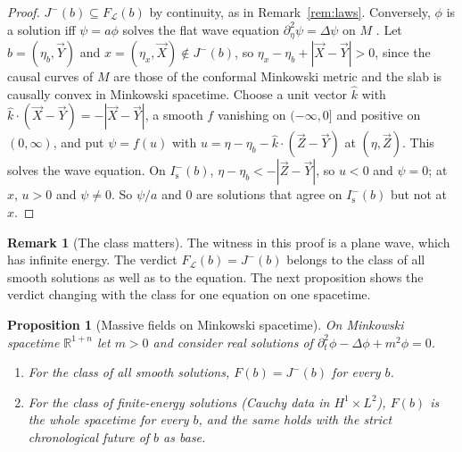 \documentclass[11pt]{article}
\newtheorem{proposition}[theorem]{Proposition}
\theoremstyle{definition}
\newtheorem{remark}[theorem]{Remark}
\newcommand{\Is}{I^-_{\mathrm s}}
\begin{document}
\begin{proof}
$J^-(b)\subseteq F_{\mathcal L}(b)$ by continuity, as in
Remark~\ref{rem:laws}. Conversely, $\phi$ is a solution iff $\psi=a\phi$
solves the flat wave equation $\partial_\eta^2\psi=\Delta\psi$ on $M$
\citep[app.~D]{Wald1984}. Let $b=(\eta_b,\vec Y)$ and $x=(\eta_x,\vec X)\notin
J^-(b)$, so $\eta_x-\eta_b+|\vec X-\vec Y|>0$, since the causal curves of $M$
are those of the conformal Minkowski metric and the slab is causally convex in
Minkowski spacetime. Choose a unit vector $\hat k$
with $\hat k\cdot(\vec X-\vec Y)=-|\vec X-\vec Y|$, a smooth $f$ vanishing on
$(-\infty,0]$ and positive on $(0,\infty)$, and put $\psi=f(u)$ with
$u=\eta-\eta_b-\hat k\cdot(\vec Z-\vec Y)$ at $(\eta,\vec Z)$. This solves the
wave equation. On $\Is(b)$, $\eta-\eta_b<-|\vec Z-\vec Y|$, so $u<0$ and
$\psi=0$; at $x$, $u>0$ and $\psi\neq0$. So $\psi/a$ and $0$ are solutions that
agree on $\Is(b)$ but not at $x$.
\end{proof}

\begin{remark}[The class matters]\label{rem:class}
The witness in this proof is a plane wave, which has infinite energy. The verdict
$F_{\mathcal L}(b)=J^-(b)$ belongs to the class of all smooth solutions as well as
to the equation. The next proposition shows the verdict changing with the class
for one equation on one spacetime.
\end{remark}

\begin{proposition}[Massive fields on Minkowski spacetime]\label{prop:massmink}
On Minkowski spacetime $\mathbb R^{1+n}$ let $m>0$ and consider real solutions
of $\partial_t^2\phi-\Delta\phi+m^2\phi=0$.
\begin{enumerate}
\item[(a)] For the class of all smooth solutions, $F(b)=J^-(b)$ for every $b$.
\item[(b)] For the class of finite-energy solutions (Cauchy data in
$H^1\times L^2$), $F(b)$ is the whole spacetime for every $b$, and the same holds
with the strict chronological future of $b$ as base.
\end{enumerate}
\end{proposition}
\end{document}
